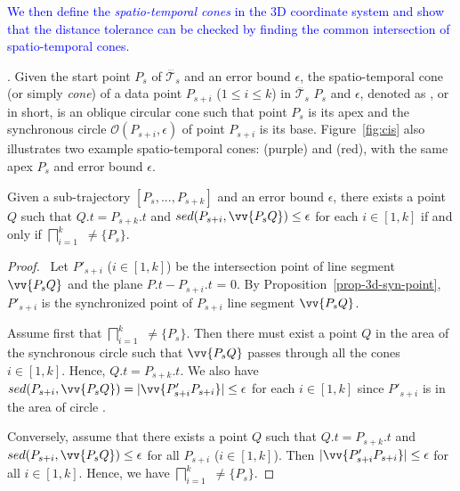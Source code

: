 \textcolor{blue}{We then define the \textit{spatio-temporal cones} in the 3D coordinate system and show that the \sed distance tolerance can be checked by finding the common intersection of spatio-temporal cones.}

. Given the start point $P_s$ of $\dddot{\mathcal{T}_s}$ and an error bound $\epsilon$, the spatio-temporal cone (or simply \textit{cone}) of a data point $P_{s+i}$ ($1\le i\le k$) in $\dddot{\mathcal{T}_s}$ \wrt $P_s$ and $\epsilon$, denoted as , or  in short, is an oblique circular cone such that point $P_s$ is its apex and the synchronous circle $\mathcal{O}(P_{s+i}, \epsilon)$ of point $P_{s+i}$ is its base.
%
Figure~\ref{fig:cis} also illustrates two example spatio-temporal cones:  {(purple)} and  (red), with the same apex $P_s$ and error bound $\epsilon$.






\begin{prop}
\label{prop-3d-ci}
Given a sub-trajectory $[P_s,...,P_{s+k}]$ and an error bound $\epsilon$, there exists a point $Q$ such that $Q.t = P_{s+k}.t$ and $sed(P_{s+i}, \vv{P_sQ})\le \epsilon$ for each $i \in [1,k]$ if and only if $\bigsqcap_{i=1}^{k}$ $\ne \{P_s\}$.
\end{prop}

\begin{proof}\
Let $P'_{s+i}$ ($i\in[1, k]$) be the intersection point of line segment $\vv{P_sQ}$ and the plane $P.t - P_{s+i}.t$ = $0$.
By Proposition~\ref{prop-3d-syn-point}, $P'_{s+i}$ is the synchronized point of $P_{s+i}$ \wrt line segment $\vv{P_sQ}$.

Assume first that $\bigsqcap_{i=1}^{k}$ $\ne \{P_s\}$. Then there must exist a point $Q $ in the area of the  synchronous circle  such that $\vv{P_sQ}$ passes through all the cones  $i\in[1, k]$. Hence,  $Q.t = P_{s+k}.t$.
We also have $sed(P_{s+i}, \vv{P_sQ}) = |\vv{P'_{s+i}P_{s+i}}| \le \epsilon$ for each $i \in [1, k]$  since $P'_{s+i}$  is in the area of circle  \circle{(P_{s+i}, \epsilon)}.

Conversely, assume that there exists a point $Q$ such that $Q.t = P_{s+k}.t$ and $sed(P_{s+i}, \vv{P_sQ})\le\epsilon$ for all $P_{s+i}$ ($i \in [1,k]$). Then $|\vv{P'_{s+i}P_{s+i}}| \le \epsilon$ for all $i \in [1, k]$. Hence, we have  $\bigsqcap_{i=1}^{k}$ $\ne \{P_s\}$. \eop
\end{proof}

